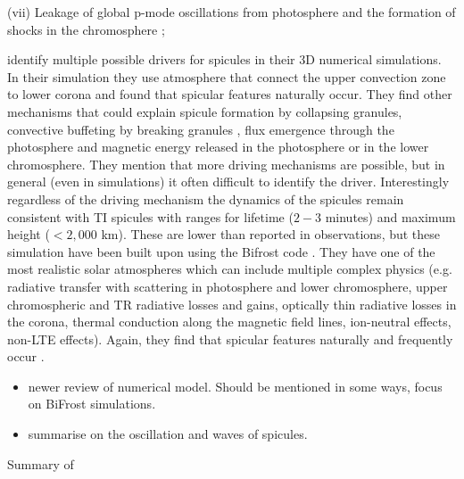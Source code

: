 (vii) Leakage of global p-mode oscillations from photosphere and the formation of shocks in the chromosphere \cite{Pontieu2004Natur,Zaqarashvili2007A&A}; 

 \cite{Mart2009ApJ7011569M} identify multiple possible drivers for spicules in their 3D numerical simulations. In their simulation they use atmosphere that connect the upper convection zone to lower corona and found that spicular features naturally occur. They find other mechanisms that could explain spicule formation by collapsing granules, convective buffeting by breaking granules \citep{Roberts1979SoPh6123R}, flux emergence through the photosphere and magnetic energy released in the photosphere or in the lower chromosphere. They mention that more driving mechanisms are possible, but in general (even in simulations) it often difficult to identify the driver. Interestingly regardless of the driving mechanism the dynamics of the spicules remain consistent with TI spicules with ranges for lifetime ($2-3$ minutes) and maximum height ($<2,000$ km). These are lower than reported in observations, but these simulation have been built upon \citep{Mart2017Sci3561269M,Mart2018ApJ860116M,Mart2020ApJ88995M} using the Bifrost code \citep{Gudiksen2011AA531A154G}. They have one of the most realistic solar atmospheres which can include multiple complex physics (e.g. radiative transfer with scattering in photosphere and lower chromosphere, upper chromospheric and TR radiative losses and gains, optically thin radiative losses in the corona, thermal conduction along the magnetic field lines, ion-neutral effects, non-LTE effects). Again, they find that spicular features naturally and frequently occur \citep{Mart2017Sci3561269M}.
\begin{itemize}
\item \cite{Carlsson2019ARAA57189C} newer review of numerical model. Should be mentioned in some ways, focus on BiFrost simulations.
\item \cite{Zaqarashvili_2009SSRv} summarise on the oscillation and waves of spicules.
\end{itemize}
Summary of \cite{Sterling_2000SoPh}
